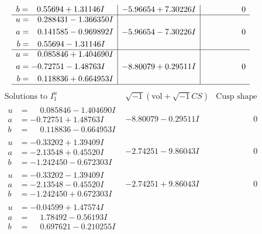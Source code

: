 \documentclass[1p]{elsarticle_modified}
\theoremstyle{definition}
\newcommand{\I}{\sqrt{-1}}
\begin{document}
$$\begin{array}{c|c|c}
\begin{aligned}
b &= \phantom{-}0.55694 + 1.31146 I\end{aligned}
 & -5.96654 + 7.30226 I & \phantom{-0.000000 } 0 \\ \hline\begin{aligned}
u &= \phantom{-}0.288431 - 1.366350 I \\
a &= \phantom{-}0.141585 - 0.969892 I \\
b &= \phantom{-}0.55694 - 1.31146 I\end{aligned}
 & -5.96654 - 7.30226 I & \phantom{-0.000000 } 0 \\ \hline\begin{aligned}
u &= \phantom{-}0.085846 + 1.404690 I \\
a &= -0.72751 - 1.48763 I \\
b &= \phantom{-}0.118836 + 0.664953 I\end{aligned}
 & -8.80079 + 0.29511 I & \phantom{-0.000000 } 0\\
 \hline 
 \end{array}$$\newpage$$\begin{array}{c|c|c}  
\text{Solutions to }I^u_{1}& \I (\text{vol} + \sqrt{-1}CS) & \text{Cusp shape}\\
 \hline 
\begin{aligned}
u &= \phantom{-}0.085846 - 1.404690 I \\
a &= -0.72751 + 1.48763 I \\
b &= \phantom{-}0.118836 - 0.664953 I\end{aligned}
 & -8.80079 - 0.29511 I & \phantom{-0.000000 } 0 \\ \hline\begin{aligned}
u &= -0.33202 + 1.39409 I \\
a &= -2.13548 + 0.45520 I \\
b &= -1.242450 - 0.672303 I\end{aligned}
 & -2.74251 - 9.86043 I & \phantom{-0.000000 } 0 \\ \hline\begin{aligned}
u &= -0.33202 - 1.39409 I \\
a &= -2.13548 - 0.45520 I \\
b &= -1.242450 + 0.672303 I\end{aligned}
 & -2.74251 + 9.86043 I & \phantom{-0.000000 } 0 \\ \hline\begin{aligned}
u &= -0.04599 + 1.47574 I \\
a &= \phantom{-}1.78492 - 0.56193 I \\
b &= \phantom{-}0.697621 - 0.210255 I\end{aligned}

\end{array}$$
\end{document}
